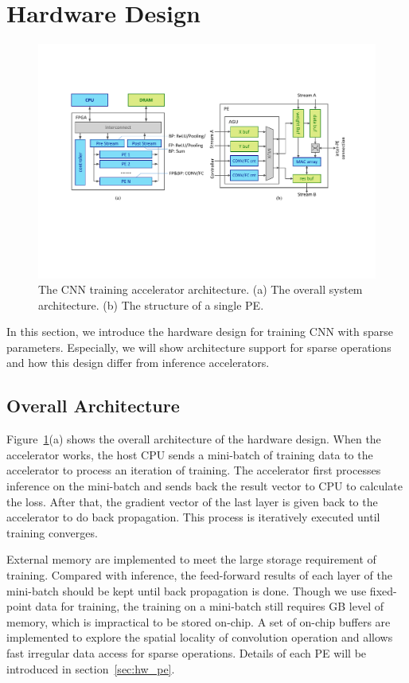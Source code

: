 \section{Hardware Design}\label{sec:hw}

\begin{figure}[htbp]
  \centering
  \includegraphics[width=2\columnwidth]{figures/hardware.pdf}
  \caption{The CNN training accelerator architecture. (a) The overall system architecture. (b) The structure of a single PE. }
  \label{fig:arch}
\end{figure}

In this section, we introduce the hardware design for training CNN with sparse parameters. Especially, we will show architecture support for sparse operations and how this design differ from inference accelerators.

\subsection{Overall Architecture}
Figure~\ref{fig:arch}(a) shows the overall architecture of the hardware design. When the accelerator works, the host CPU sends a mini-batch of training data to the accelerator to process an iteration of training. The accelerator first processes inference on the mini-batch and sends back the result vector to CPU to calculate the loss. After that, the gradient vector of the last layer is given back to the accelerator to do back propagation. This process is iteratively executed until training converges.

External memory are implemented to meet the large storage requirement of training. Compared with inference, the feed-forward results of each layer of the mini-batch should be kept until back propagation is done. Though we use fixed-point data for training, the training on a mini-batch still requires GB level of memory, which is impractical to be stored on-chip. A set of on-chip buffers are implemented to explore the spatial locality of convolution operation and allows fast irregular data access for sparse operations. Details of each PE will be introduced in section~\ref{sec:hw_pe}.

